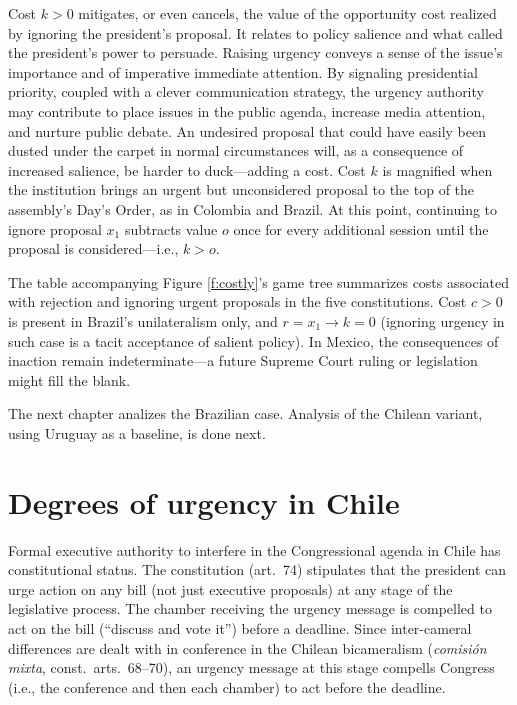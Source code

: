 \documentclass[letter,12pt]{article}
\begin{document}
Cost $k>0$ mitigates, or even cancels, the value of the opportunity cost realized by ignoring the president's proposal. It relates to policy salience and what \citet{neustadt.1990} called the president's power to persuade. Raising urgency conveys a sense of the issue's importance and of imperative immediate attention. By signaling presidential priority, coupled with a clever communication strategy, the urgency authority may contribute to place issues in the public agenda, increase media attention, and nurture public debate. An undesired proposal that could have easily been dusted under the carpet in normal circumstances will, as a consequence of increased salience, be harder to duck---adding a cost. Cost $k$ is magnified when the institution brings an urgent but unconsidered proposal to the top of the assembly's Day's Order, as in Colombia and Brazil. At this point, continuing to ignore proposal $x_1$ subtracts value $o$ once for every additional session until the proposal is considered---i.e., $k>o$. 

The table accompanying Figure \ref{f:costly}'s game tree summarizes costs associated with rejection and ignoring urgent proposals in the five constitutions. Cost $c>0$ is present in Brazil's unilateralism only, and $r=x_1 \rightarrow k=0$ (ignoring urgency in such case is a tacit acceptance of salient policy). In Mexico, the consequences of inaction remain indeterminate---a future Supreme Court ruling or legislation might fill the blank. 

The next chapter analizes the Brazilian case. Analysis of the Chilean variant, using Uruguay as a baseline, is done next.

\section{Degrees of urgency in Chile}

Formal executive authority to interfere in the Congressional agenda in Chile has constitutional status. The constitution (art.\ 74) stipulates that the president can urge action on any bill (not just executive proposals) at any stage of the legislative process. The chamber receiving the urgency message is compelled to act on the bill (``discuss and vote it'') before a deadline. Since inter-cameral differences are dealt with in conference in the Chilean bicameralism (\emph{comisión mixta}, const.\ arts.\ 68--70), an urgency message at this stage compells Congress (i.e., the conference and then each chamber) to act before the deadline. 
\end{document}
